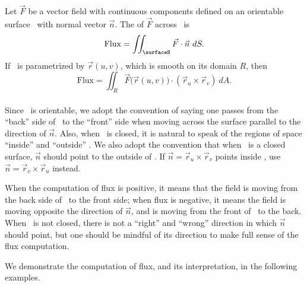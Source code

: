 {Let $\vec F$ be a vector field with continuous components defined on an orientable surface \surfaceS\ with normal vector $\vec n$. The  of $\vec F$ across \surfaceS\ is
\[
\text{Flux} = \iint_\surfaceS \vec F\cdot \vec n\ dS.
\]
If \surfaceS\ is parametrized by $\vec r(u,v)$, which is smooth on its domain $R$, then
\[
\text{Flux} = \iint_R \vec F\big(\vec r(u,v)\big)\cdot (\vec r_u\times \vec r_v)\ dA.
\]
}\\

Since \surfaceS\ is orientable, we adopt the convention of saying one passes from the ``back'' side of \surfaceS\ to the ``front'' side when moving across the surface parallel to the direction of $\vec n$. Also, when \surfaceS\ is closed, it is natural to speak of the regions of space ``inside'' and ``outside'' \surfaceS. We also adopt the convention that when \surfaceS\ is a closed surface, $\vec n$ should point to the outside of \surfaceS. If $\vec n = \vec r_u\times\vec r_v$ points inside \surfaceS, use $\vec n = \vec r_v\times \vec r_u$ instead.

When the computation of flux is positive, it means that the field is moving from the back side of \surfaceS\ to the front side; when flux is negative, it means the field is moving opposite the direction of $\vec n$, and is moving from the front of \surfaceS\ to the back. When \surfaceS\ is not closed, there is not a ``right'' and ``wrong'' direction in which $\vec n$ should point, but one should be mindful of its direction to make full sense of the flux computation.

We demonstrate the computation of flux, and its interpretation, in the following examples.\\

